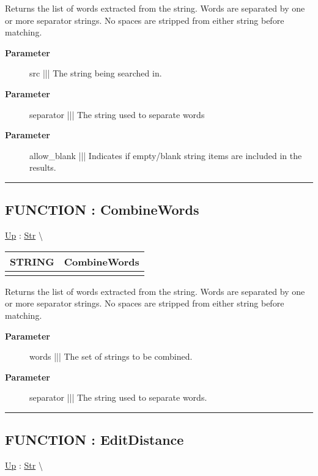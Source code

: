 \par
Returns the list of words extracted from the string. Words are separated by one or more separator strings. No spaces are stripped from either string before matching.

\par
\begin{description}
\item [\textbf{Parameter}] src ||| The string being searched in.
\item [\textbf{Parameter}] separator ||| The string used to separate words
\item [\textbf{Parameter}] allow\_blank ||| Indicates if empty/blank string items are included in the results.
\end{description}

\rule{\linewidth}{0.5pt}
\subsection*{FUNCTION : CombineWords}
\hypertarget{ecldoc:str.combinewords}{}
\hyperlink{ecldoc:Str}{Up} :
\hspace{0pt} \hyperlink{ecldoc:Str}{Str} \textbackslash 

{\renewcommand{\arraystretch}{1.5}
\begin{tabularx}{\textwidth}{|>{\raggedright\arraybackslash}l|X|}
\hline
\hspace{0pt}STRING & CombineWords \\
\hline
\multicolumn{2}{|>{\raggedright\arraybackslash}X|}{\hspace{0pt}(SET OF STRING words, STRING separator)} \\
\hline
\end{tabularx}
}

\par
Returns the list of words extracted from the string. Words are separated by one or more separator strings. No spaces are stripped from either string before matching.

\par
\begin{description}
\item [\textbf{Parameter}] words ||| The set of strings to be combined.
\item [\textbf{Parameter}] separator ||| The string used to separate words.
\end{description}

\rule{\linewidth}{0.5pt}
\subsection*{FUNCTION : EditDistance}
\hypertarget{ecldoc:str.editdistance}{}
\hyperlink{ecldoc:Str}{Up} :
\hspace{0pt} \hyperlink{ecldoc:Str}{Str} \textbackslash 

